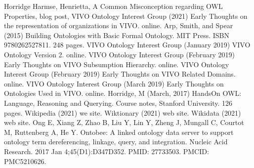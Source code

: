 \documentclass[letterpaper,10pt,english]{sphinxmanual}
\begin{document}
\begin{sphinxthebibliography}{Horridge}
\sphinxAtStartPar
Harmse, Henrietta, A Common Misconception regarding OWL Properties,
blog post,
\sphinxAtStartPar
VIVO Ontology Interest Group (2021) Early Thoughts on the representation
of organizations in VIVO.  on\sphinxhyphen{}line.  
\sphinxAtStartPar
Arp, Smith, and Spear (2015) Building Ontologies with Basic Formal Ontology.
MIT Press. ISBN 978\sphinxhyphen{}0262527811.  248 pages.
\sphinxAtStartPar
VIVO Ontology Interest Group (January 2019) VIVO Ontology Version 2.
on\sphinxhyphen{}line.
\sphinxAtStartPar
VIVO Ontology Interest Group (February 2019) Early Thoughts on VIVO
Subsumption Hierarchy.  on\sphinxhyphen{}line.  
\sphinxAtStartPar
VIVO Ontology Interest Group (February 2019) Early Thoughts on VIVO
Related Domains.  on\sphinxhyphen{}line.  
\sphinxAtStartPar
VIVO Ontology Interest Group (March 2019) Early Thoughts on Ontologies
Used in VIVO.  on\sphinxhyphen{}line.  
\sphinxAtStartPar
Horridge, M (March, 2017) Hands\sphinxhyphen{}On OWL:  Language, Reasoning
and Querying.  Course notes, Stanford University.  126 pages.
\sphinxAtStartPar
Wikipedia (2021) we site.  
\sphinxAtStartPar
Wiktionary (2021) web site. 
\sphinxAtStartPar
Wikidata (2021) web site. 
\sphinxAtStartPar
Ong E, Xiang Z, Zhao B, Liu Y, Lin Y, Zheng J, Mungall C, Courtot M,
Ruttenberg A, He Y. Ontobee: A linked ontology data server to support ontology term
dereferencing, linkage, query, and integration. Nucleic Acid Research. 2017
Jan 4;45(D1):D347\sphinxhyphen{}D352. PMID: 27733503. PMCID: PMC5210626.
\sphinxAtStartPar

\end{sphinxthebibliography}
\end{document}

